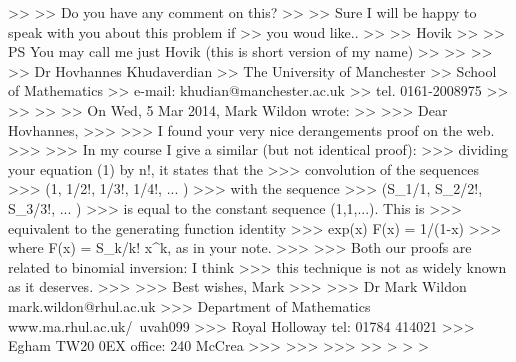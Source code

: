>>
>>  Do you have any comment on this?
>>
>>   Sure I will be happy to speak with you about this problem if
>> you woud like..
>>
>>           Hovik
>>
>> PS You may call me just Hovik (this is short version of my name)
>>
>>
>>
>>                                    Dr Hovhannes Khudaverdian
>>                                   The University of Manchester
>>                                      School of Mathematics
>>                                  e-mail: khudian@manchester.ac.uk
>>                                       tel. 0161-2008975
>>
>>
>>
>> On Wed, 5 Mar 2014, Mark Wildon wrote:
>>
>>> Dear Hovhannes,
>>>
>>> I found your very nice derangements proof on the web.
>>>
>>> In my course I give a similar (but not identical proof):
>>> dividing your equation (1) by n!, it states that the
>>> convolution of the sequences
>>> 	(1, 1/2!, 1/3!, 1/4!, ... )
>>> with the sequence
>>> 	(S_1/1, S_2/2!, S_3/3!, ... )
>>> is equal to the constant sequence (1,1,...). This is
>>> equivalent to the generating function identity
>>> 	exp(x) F(x) = 1/(1-x)
>>> where F(x) = \sum S_k/k! x^k, as in your note.
>>>
>>> Both our proofs are related to binomial inversion: I think
>>> this technique is not as widely known as it deserves.
>>>
>>> Best wishes, Mark
>>>
>>> Dr Mark Wildon                          mark.wildon@rhul.ac.uk
>>> Department of Mathematics           www.ma.rhul.ac.uk/~uvah099
>>> Royal Holloway                               tel: 01784 414021
>>> Egham TW20 0EX                              office: 240 McCrea
>>>
>>>
>>>
>>
>
>
>
